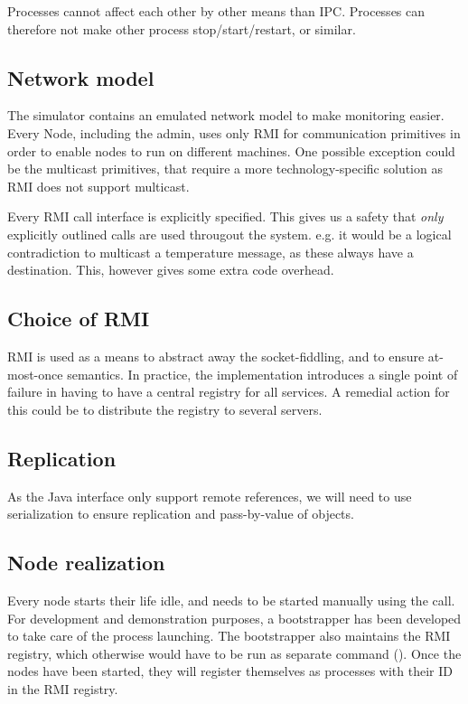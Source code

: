 \documentclass[10pt,a4paper]{article}
\begin{document}
Processes cannot affect each other by other means than IPC. Processes can therefore not make other process stop/start/restart, or similar.

\subsection{Network model}
The simulator contains an emulated network model to make monitoring easier. Every Node, including the admin, uses only RMI for communication primitives in order to enable nodes to run on different machines.
One possible exception could be the multicast primitives, that require a more technology-specific solution as RMI does not support multicast.

Every RMI call interface is explicitly specified. This gives us a safety that \emph{only} explicitly outlined calls are used througout the system. e.g. it would be a logical contradiction to multicast a temperature message, as these always have a destination. This, however gives some extra code overhead.

\subsection{Choice of RMI}
RMI is used as a means to abstract away the socket-fiddling, and to ensure at-most-once semantics. In practice, the implementation introduces a single point of failure in having to have a central registry for all services. A remedial action for this could be to distribute the registry to several servers.

\subsection{Replication}
As the Java interface  only support remote references, we will need to use serialization to ensure replication and pass-by-value of objects.

\subsection{Node realization}
Every node starts their life idle, and needs to be started manually using the  call. For development and demonstration purposes, a bootstrapper has been developed to take care of the process launching. The bootstrapper also maintains the RMI registry, which otherwise would have to be run as separate command ().
Once the nodes have been started, they will register themselves as processes with their ID in the RMI registry.
\end{document}
